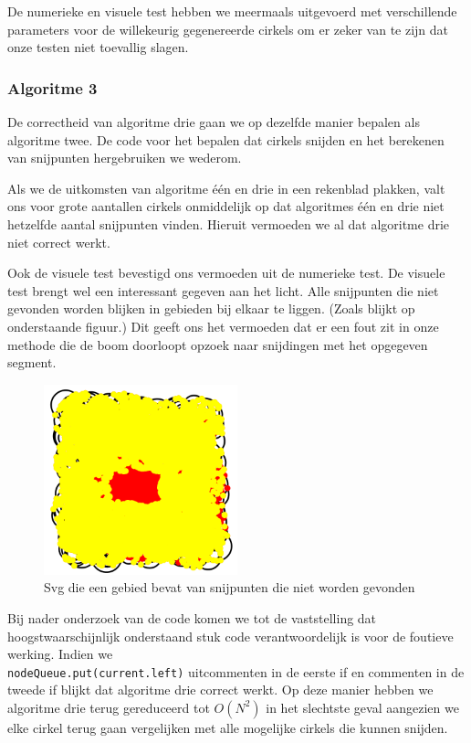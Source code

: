 \documentclass[11pt,a4paper]{article}
\begin{document}
De numerieke en visuele test hebben we meermaals uitgevoerd met verschillende parameters voor de willekeurig gegenereerde cirkels om er zeker van te zijn dat onze testen niet toevallig slagen.

\subsubsection{Algoritme 3}

De correctheid van algoritme drie gaan we op dezelfde manier bepalen als algoritme twee. De code voor het bepalen dat cirkels snijden en het berekenen van snijpunten hergebruiken we wederom.

Als we de uitkomsten van algoritme \'e\'en en drie in een rekenblad plakken, valt ons voor grote aantallen cirkels onmiddelijk op dat algoritmes \'e\'en en drie niet hetzelfde aantal snijpunten vinden. Hieruit vermoeden we al dat algoritme drie niet correct werkt.

Ook de visuele test bevestigd ons vermoeden uit de numerieke test. De visuele test brengt wel een interessant gegeven aan het licht. Alle snijpunten die niet gevonden worden blijken in gebieden bij elkaar te liggen. (Zoals blijkt op onderstaande figuur.) Dit geeft ons het vermoeden dat er een fout zit in onze methode die de boom doorloopt opzoek naar snijdingen met het opgegeven segment.

\begin{figure}[H]
\centering
\includegraphics[width=0.5\textwidth]{gat_midden.png}
\caption*{Svg die een gebied bevat van snijpunten die niet worden gevonden}
\end{figure}

Bij nader onderzoek van de code komen we tot de vaststelling dat hoogstwaarschijnlijk onderstaand stuk code verantwoordelijk is voor de foutieve werking. Indien we \\ \verb|nodeQueue.put(current.left)| uitcommenten in de eerste if en commenten in de tweede if blijkt dat algoritme drie correct werkt. Op deze manier hebben we algoritme drie terug gereduceerd tot $O(N^{2})$ in het slechtste geval aangezien we elke cirkel terug gaan vergelijken met alle mogelijke cirkels die kunnen snijden.
\end{document}
